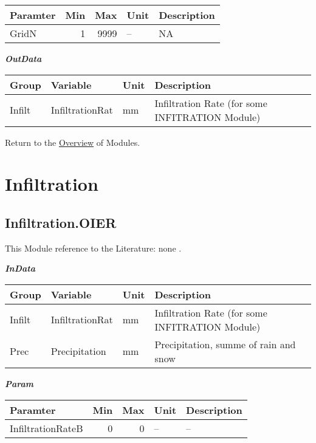\documentclass[
]{book}
\begin{document}
\begin{table}[!h]
\centering
\begin{tabular}{l|r|r|l|l}
\hline
Paramter & Min & Max & Unit & Description\\
\hline
GridN & 1 & 9999 & -- & NA\\
\hline
\end{tabular}
\end{table}

\textbf{\emph{OutData}}

\begin{table}[!h]
\centering
\begin{tabular}{l|l|l|l}
\hline
Group & Variable & Unit & Description\\
\hline
Infilt & InfiltrationRat & mm & Infiltration Rate (for some INFITRATION Module)\\
\hline
\end{tabular}
\end{table}

Return to the \protect\hyperlink{module}{Overview} of Modules.

\hypertarget{Infiltration}{%
\section{Infiltration}\label{Infiltration}}

\hypertarget{Infiltration.OIER}{%
\subsection{Infiltration.OIER}\label{Infiltration.OIER}}

This Module reference to the Literature: none \citep{none}.

\textbf{\emph{InData}}

\begin{table}[!h]
\centering
\begin{tabular}{l|l|l|l}
\hline
Group & Variable & Unit & Description\\
\hline
Infilt & InfiltrationRat & mm & Infiltration Rate (for some INFITRATION Module)\\
\cline{1-4}
Prec & Precipitation & mm & Precipitation, summe of rain and snow\\
\hline
\end{tabular}
\end{table}

\textbf{\emph{Param}}

\begin{table}[!h]
\centering
\begin{tabular}{l|r|r|l|l}
\hline
Paramter & Min & Max & Unit & Description\\
\hline
InfiltrationRateB & 0 & 0 & -- & --\\
\hline
\end{tabular}
\end{table}
\end{document}
